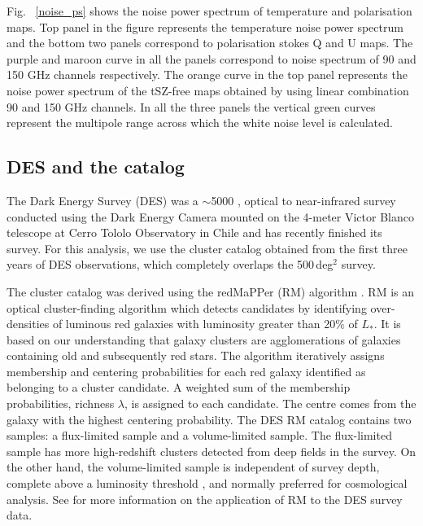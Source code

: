 Fig. ~\ref{noise_ps} shows the noise power spectrum of temperature and polarisation maps. 
Top panel in the figure represents the temperature noise power spectrum and the bottom two panels correspond to polarisation stokes Q and U maps. 
The purple and maroon curve in all the panels correspond to noise spectrum of 90 and 150 GHz channels respectively.
The orange curve in the top panel represents the noise power spectrum of the tSZ-free maps obtained by using linear combination 90 and 150 GHz channels. 
In all the three panels the vertical green curves represent the multipole range across which the white noise level is calculated.


\subsection{DES and the {\rm \RM} catalog}\label{sec_DES}
The Dark Energy Survey (DES) was a $\sim$5000 \sqdeg, optical to near-infrared survey conducted using the Dark Energy Camera \citep{flaugher15} mounted on the 4-meter Victor Blanco telescope at Cerro Tololo Observatory in Chile and has recently finished its survey. 
For this analysis, we use the cluster catalog obtained from the first three years of DES observations, which completely overlaps the \sptpol{} 500\,deg$^{2}$ survey. 

The cluster catalog was derived using the redMaPPer (RM) algorithm \citep{rykoff14}.
RM is an optical cluster-finding algorithm which detects candidates by identifying over-densities of luminous red galaxies with luminosity greater than 20\% of $L_{*}.$
It is based on our understanding that galaxy clusters are agglomerations of galaxies containing old and subsequently red stars. 
The algorithm iteratively assigns membership and centering probabilities for each red galaxy identified as belonging to a cluster candidate. 
A weighted sum of the membership probabilities, richness $\lambda$, is assigned to each candidate.
The centre comes from the galaxy with the highest centering probability.
The DES RM catalog contains two samples: a flux-limited sample and a volume-limited sample. 
The flux-limited sample has more high-redshift clusters detected from deep fields in the survey. 
On the other hand, the volume-limited sample is independent of survey depth, complete above a luminosity threshold \citep{mcclintock18}, and normally preferred for cosmological analysis.
See \citet{rykoff16} for more information on the application of RM to the DES survey data.

